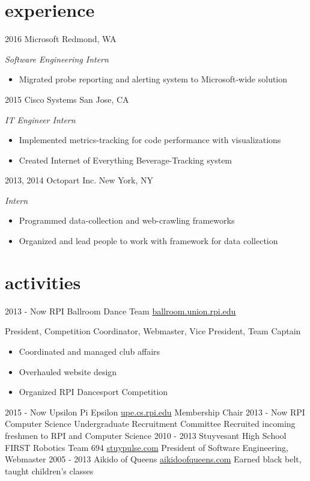 \documentclass[]{friggeri-cv}
\begin{document}
\section{experience}

\begin{entrylist}
  \entry
    {2016}
    {Microsoft}
    {Redmond, WA}
    {\emph{Software Engineering Intern}
    \begin{itemize}
        \item Migrated probe reporting and alerting system to Microsoft-wide solution
    \end{itemize}
    }
  \entry
    {2015}
    {Cisco Systems}
    {San Jose, CA}
    {\emph{IT Engineer Intern}
    \begin{itemize}
        \item Implemented metrics-tracking for code performance with visualizations
        \item Created Internet of Everything Beverage-Tracking system
    \end{itemize}
    }
  \entry
    {2013, 2014}
    {Octopart Inc.}
    {New York, NY}
    {\emph{Intern}
    \begin{itemize}
        \item Programmed data-collection and web-crawling frameworks
        \item Organized and lead people to work with framework for data collection
    \end{itemize}
    }
\end{entrylist}

\section{activities}

\begin{entrylist}
  \entry
    {2013 - Now}
    {RPI Ballroom Dance Team}
    {\href{http://ballroom.union.rpi.edu}{ballroom.union.rpi.edu}}
    {President, Competition Coordinator, Webmaster, Vice President, Team Captain
    \begin{itemize}
        \item Coordinated and managed club affairs
        \item Overhauled website design
        \item Organized RPI Dancesport Competition
    \end{itemize}
    }
  \entry
    {2015 - Now}
    {Upsilon Pi Epsilon}
    {\href{http://upe.cs.rpi.edu}{upe.cs.rpi.edu}}
    {Membership Chair}
  \entry
    {2013 - Now}
    {RPI Computer Science Undergraduate Recruitment Committee}
    {}
    {Recruited incoming freshmen to RPI and Computer Science}
  \entry
    {2010 - 2013}
    {Stuyvesant High School FIRST Robotics Team 694}
    {\href{http://stuypulse.com}{stuypulse.com}}
    {President of Software Engineering, Webmaster}
  \entry
    {2005 - 2013}
    {Aikido of Queens}
    {\href{http://aikidoofqueens.com}{aikidoofqueens.com}}
    {Earned black belt, taught children's classes}
\end{entrylist}
\end{document}

